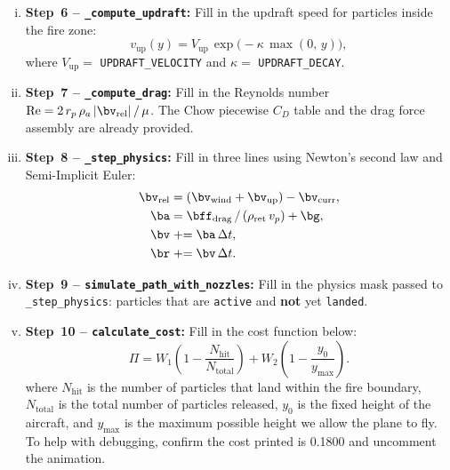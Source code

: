 \documentclass{article}
\begin{document}
\begin{enumerate}
\begin{enumerate}[(i)]
    \item \textbf{Step~6 -- \texttt{\_compute\_updraft}:}
          Fill in the updraft speed for particles inside the fire zone:
          \begin{equation*}
              v_\text{up}(y) = V_\text{up}\,\exp\!\bigl(-\kappa\,\max(0,\,y)\bigr),
          \end{equation*}
          where $V_\text{up} = $ \texttt{UPDRAFT\_VELOCITY} and $\kappa = $ \texttt{UPDRAFT\_DECAY}.

    \item \textbf{Step~7 -- \texttt{\_compute\_drag}:}
          Fill in the Reynolds number
          $\mathrm{Re} = 2\,r_p\,\rho_a\,|\bv_\text{rel}|\,/\,\mu$.
          The Chow piecewise $C_D$ table and the drag force assembly are already provided.

    \item \textbf{Step~8 -- \texttt{\_step\_physics}:}
          Fill in three lines using Newton's second law and Semi-Implicit Euler:
          \begin{align*}
              \bv_\text{rel} &= (\bv_\text{wind} + \bv_\text{up}) - \bv_\text{curr}, \\
              \ba             &= \bff_\text{drag}\,/\,(\rho_\text{ret}\,v_p) + \bg, \\
              \bv             &\mathrel{+}= \ba\,\Delta t, \\ 
              \br              &\mathrel{+}= \bv\,\Delta t.
          \end{align*}

    \item \textbf{Step~9 -- \texttt{simulate\_path\_with\_nozzles}:}
          Fill in the physics mask passed to \texttt{\_step\_physics}:
          particles that are \texttt{active} and \textbf{not} yet \texttt{landed}.

    \item \textbf{Step~10 -- \texttt{calculate\_cost}:}
          Fill in the cost function below:
          \begin{equation*} \label{eq:cost}
              \Pi = W_1\!\left(1 - \frac{N_\text{hit}}{N_\text{total}}\right)
                  + W_2\!\left(1 - \frac{y_0}{y_{\max}}\right).
          \end{equation*}
          where $N_\text{hit}$ is the number of particles that land within the fire boundary,  $N_\text{total}$ is the total number of particles released, $y_0$ is the fixed height of the aircraft, and $y_{\text{max}}$ is the maximum possible height we allow the plane to fly.
To help with debugging, confirm the cost printed is 0.1800 and uncomment the animation.
\end{enumerate}
\begin{answer}


\end{answer}
\end{enumerate}
\end{document}
